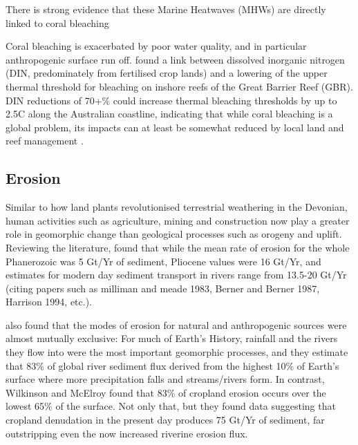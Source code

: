 \documentclass[11pt,a4paper]{article}
\begin{document}
There is strong evidence that these Marine Heatwaves (MHWs) are directly linked to coral bleaching \citep{Eakin2016,Hughes2018a,Hughes2018b}

Coral bleaching is exacerbated by poor water quality, and in particular anthropogenic surface run off. \cite{Wooldridge2009} found a link between dissolved inorganic nitrogen (DIN, predominately from fertilised crop lands) and a lowering of the upper thermal threshold for bleaching on inshore reefs of the Great Barrier Reef (GBR). DIN reductions of 70+\% could increase thermal bleaching thresholds by up to 2.5\textdegree C along the Australian coastline, indicating that while coral bleaching is a global problem, its impacts can at least be somewhat reduced by local land and reef management \cite{Wooldridge2009}.

\subsection{Erosion}

Similar to how land plants revolutionised terrestrial weathering in the Devonian,  human activities such as agriculture, mining and construction now play a greater role in geomorphic change than geological processes such as orogeny and uplift. Reviewing the literature, \cite{WilkinsonMcElroy2007} found that while the mean rate of erosion for the whole Phanerozoic was 5 Gt/Yr of sediment, Pliocene values were 16 Gt/Yr, and estimates for modern day sediment transport in rivers  range from 13.5-20 Gt/Yr (citing papers such as milliman and meade 1983, Berner and Berner 1987, Harrison 1994, etc.). 
 
\cite{WilkinsonMcElroy2007} also found that the modes of erosion for natural and anthropogenic sources were almost mutually exclusive: For much of Earth's History, rainfall and the rivers they flow into were the most important geomorphic processes, and they estimate that 83\% of global river sediment flux derived from the highest 10\% of Earth's surface where more precipitation falls and streams/rivers form. In contrast, Wilkinson and McElroy found that 83\% of cropland erosion occurs over the lowest 65\% of the surface. Not only that, but they found data suggesting that cropland denudation in the present day produces 75 Gt/Yr of sediment, far outstripping even the now increased riverine erosion flux.
\end{document}
